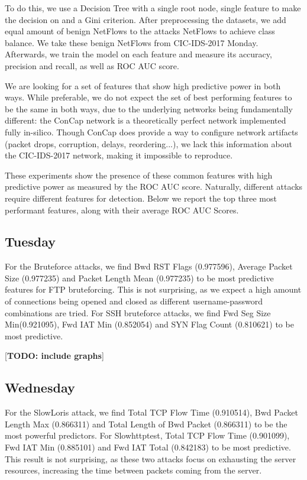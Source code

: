 \documentclass[conference]{IEEEtran}
\begin{document}
	To do this, we use a Decision Tree with a single root node, single feature to make the decision on and a Gini criterion. After preprocessing the datasets, we add equal amount of benign NetFlows to the attacks NetFlows to achieve class balance. We take these benign NetFlows from CIC-IDS-2017 Monday. Afterwards, we train the model on each feature and measure its accuracy, precision and recall, as well as ROC AUC score. 
	
	We are looking for a set of features that show high predictive power in both ways. While preferable, we do not expect the set of best performing features to be the same in both ways, due to the underlying networks being fundamentally different: the ConCap network is a theoretically perfect network implemented fully in-silico. Though ConCap does provide a way to configure network artifacts (packet drops, corruption, delays, reordering...), we lack this information about the CIC-IDS-2017 network, making it impossible to reproduce.
	
	These experiments show the presence of these common features with high predictive power as measured by the ROC AUC score. Naturally, different attacks require different features for detection. Below we report the top three most performant features, along with their average ROC AUC Scores.
	
	\subsection{Tuesday}
	For the Bruteforce attacks, we find Bwd RST Flags (0.977596), Average Packet Size (0.977235) and Packet Length Mean (0.977235) to be most predictive features for FTP bruteforcing. This is not surprising, as we expect a high amount of connections being opened and closed as different username-password combinations are tried. For SSH bruteforce attacks, we find Fwd Seg Size Min(0.921095), Fwd IAT Min (0.852054) and SYN Flag Count (0.810621) to be most predictive. 
	
	[\textbf{TODO: include graphs}]
	
	\subsection{Wednesday}
	For the SlowLoris attack, we find Total TCP Flow Time (0.910514), Bwd Packet Length Max (0.866311) and Total Length of Bwd Packet (0.866311) to be the most powerful predictors. For Slowhttptest, Total TCP Flow Time (0.901099), Fwd IAT Min (0.885101) and Fwd IAT Total (0.842183) to be most predictive. This result is not surprising, as these two attacks focus on exhausting the server resources, increasing the time between packets coming from the server.
	
\end{document}
